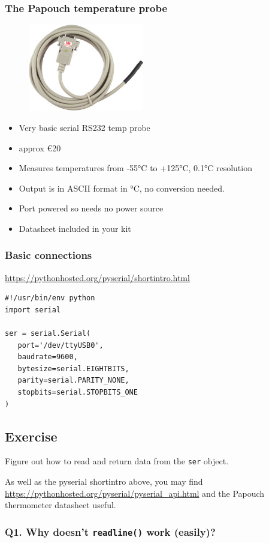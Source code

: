 \documentclass[aspectratio=1610,9pt]{beamer} %
\begin{document}
\begin{frame}
\frametitle{The Papouch temperature probe}

\begin{figure}
\vspace{-3cm}
\includegraphics[width=0.45\textwidth]{papouchprobe.jpeg}
\end{figure}
\par
\begin{minipage}{0.45\textwidth}
\begin{itemize}
\itemsep1pt\parskip0pt
\item
  Very basic serial RS232 temp probe
\item
  approx €20
\item
  Measures temperatures from -55°C to +125°C, 0.1°C resolution
\item
  Output is in ASCII format in °C, no conversion needed.
\item
  Port powered so needs no power source
\item
  Datasheet included in your kit
\end{itemize}
\end{minipage}

\end{frame}
\begin{frame}[fragile=singleslide]
\frametitle{Basic connections}

\href{https://pythonhosted.org/pyserial/shortintro.html}{https://pythonhosted.org/pyserial/shortintro.html}

\begin{verbatim}
#!/usr/bin/env python
import serial

ser = serial.Serial(
   port='/dev/ttyUSB0',
   baudrate=9600,
   bytesize=serial.EIGHTBITS,
   parity=serial.PARITY_NONE,
   stopbits=serial.STOPBITS_ONE
)
\end{verbatim}

\subsection{Exercise}

Figure out how to read and return data from the \texttt{ser} object.

As well as the pyserial shortintro above, you may find
\url{https://pythonhosted.org/pyserial/pyserial_api.html}
and the Papouch thermometer datasheet useful.

\subsubsection{Q1. Why doesn't \texttt{readline()} work (easily)?}

\end{frame}
\end{document}

